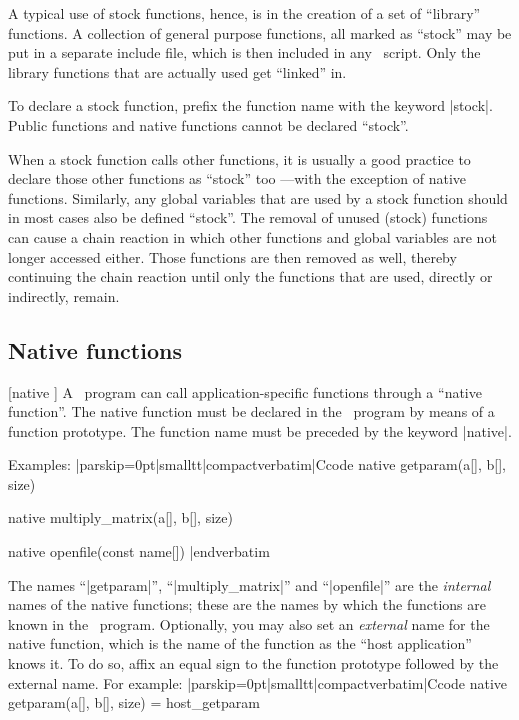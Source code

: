 A typical use of stock functions, hence, is in the creation of a set of
``library'' functions. A collection of general purpose functions, all marked
as ``stock'' may be put in a separate include file, which is then included in
any \Small\ script. Only the library functions that are actually used get
``linked'' in.

To declare a stock function, prefix the function name with the keyword |stock|.
Public functions and native functions cannot be declared ``stock''.

When a stock function calls other functions, it is usually a good practice
to declare those other functions as ``stock'' too ---with the exception of
native functions.
%
Similarly, any global variables that are used by a stock
function should in most cases also be defined ``stock''. The removal of
unused (stock) functions can cause a chain reaction in which other functions
and global variables are not longer accessed either. Those functions are then
removed as well, thereby continuing the chain reaction until only the functions
that are used, directly or indirectly, remain.


\subsection{Native functions}
[native \midtilde]
A \Small\ program can call application-specific functions through a ``native
function''. The native function must be declared in the \Small\ program by
means of a function prototype. The function name must be preceded by the keyword
|native|.

Examples:
\listingx\verbatim|parskip=0pt|smalltt|compactverbatim|Ccode
native getparam(a[], b[], size)

native multiply_matrix(a[], b[], size)

native openfile(const name[])
|endverbatim\endlistingx

%
The names ``|getparam|'', ``|multiply_matrix|'' and ``|openfile|'' are the
{\it internal\/} names of the native functions; these are the names by which
the functions are known in the \Small\ program. Optionally, you may also set an
{\it external\/} name for the native function, which is the name of the function
as the ``host application'' knows it. To do so, affix an equal sign to the
function prototype followed by the external name. For example:
\listingx\verbatim|parskip=0pt|smalltt|compactverbatim|Ccode
native getparam(a[], b[], size) = host_getparam

